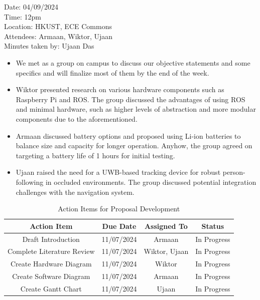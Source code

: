 \documentclass{article}
\begin{document}
Date: 04/09/2024 \\
Time: 12pm \\
Location: HKUST, ECE Commons \\
Attendees: Armaan, Wiktor, Ujaan \\
Minutes taken by: Ujaan Das

\begin{itemize}
    \item We met as a group on campus to discuss our objective statements and some specifics and will finalize most of them by the end of the week.
    \item Wiktor presented research on various hardware components such as Raspberry Pi and ROS. The group discussed the advantages of using ROS and minimal hardware, such as higher levels of abstraction and more modular components due to the aforementioned.
    \item Armaan discussed battery options and proposed using Li-ion batteries to balance size and capacity for longer operation. Anyhow, the group agreed on targeting a battery life of 1 hours for initial testing.
    \item Ujaan raised the need for a UWB-based tracking device for robust person-following in occluded environments. The group discussed potential integration challenges with the navigation system.
\end{itemize}

\begin{table}[h]
    \centering
    \begin{tabular}{|c|c|c|c|}
        \hline
        \textbf{Action Item} & \textbf{Due Date} & \textbf{Assigned To} & \textbf{Status} \\
        \hline
        Draft Introduction & 11/07/2024 & Armaan & In Progress \\
        \hline
        Complete Literature Review & 11/07/2024 & Wiktor, Ujaan & In Progress \\
        \hline
        Create Hardware Diagram & 11/07/2024 & Wiktor & In Progress \\
        \hline
        Create Software Diagram & 11/07/2024 & Armaan & In Progress \\
        \hline
        Create Gantt Chart & 11/07/2024 & Ujaan & In Progress \\
        \hline
    \end{tabular}
    \caption{Action Items for Proposal Development}
    \label{tab:proposal_action_items}
\end{table}
\end{document}
